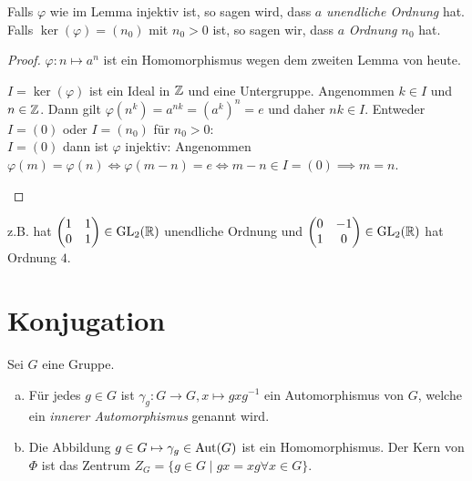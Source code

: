 \begin{definition}
	Falls $\varphi$ wie im Lemma injektiv ist, so sagen wird, dass $a$ \emph{unendliche Ordnung} hat.
	Falls $\ker(\varphi) = (n_0)$ mit $n_0 > 0$ ist, so sagen wir, dass $a$ \emph{Ordnung $n_0$} hat.
\end{definition}

\begin{proof}
	$\varphi: n \mapsto a^{n}$ ist ein Homomorphismus wegen dem zweiten Lemma von heute.
	\begin{remark}
		$I = \ker(\varphi)$ ist ein Ideal in $\mathbb{Z}$ und eine Untergruppe.
		Angenommen  $k \in I$ und $n \in \mathbb{Z}$. Dann gilt $\varphi(n^{k}) = a^{nk} = (a^{k})^{n} = e$ und daher $nk \in I$.
		Entweder $I = (0)$ oder $I = (n_0)$ für $n_0 > 0$:\\
		$I = (0)$ dann ist $\varphi$ injektiv:
		Angenommen $\varphi(m) = \varphi(n) \Leftrightarrow \varphi(m-n) = e \Leftrightarrow m-n \in I = (0) \implies m=n$.
	\end{remark}
\end{proof}

\begin{eg}
	z.B. hat
	$\begin{pmatrix} 
		1 & 1\\ 0 &1
	\end{pmatrix} \in \operatorname{GL}_2(\mathbb{R})$ unendliche Ordnung und  $\begin{pmatrix} 
		0 &-1\\ 1 & 0
	\end{pmatrix} \in \operatorname{GL}_2(\mathbb{R})$ hat Ordnung $4$.
\end{eg}

\section{Konjugation}

\begin{lemma}
	Sei $G$ eine Gruppe.
	\begin{enumerate}[a)]
		\item Für jedes $g \in G$ ist $\gamma_{g}: G \to G, x \mapsto g x g^{-1}$ ein Automorphismus von $G$, welche ein \emph{innerer Automorphismus} genannt wird.
		\item Die Abbildung $g \in G \mapsto \gamma_{g} \in \operatorname{Aut}(G)$ ist ein Homomorphismus.
			Der Kern von $\Phi$ ist das Zentrum $Z_{G} = \{g \in G \mid gx = xg \forall x \in G\} $.
	\end{enumerate}
\end{lemma}

